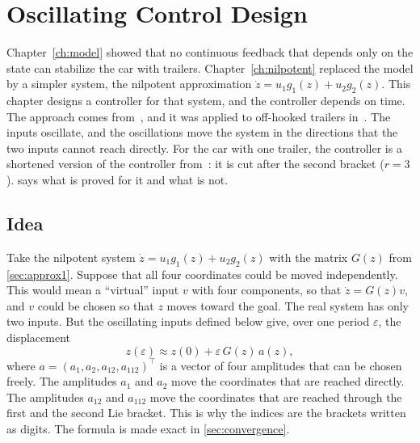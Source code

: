 
\chapter{Oscillating Control Design}
\label{ch:control}

Chapter~\ref{ch:model} showed that no continuous feedback that depends only on
the state can stabilize the car with trailers. Chapter~\ref{ch:nilpotent}
replaced the model by a simpler system, the nilpotent approximation
$\dot z=u_1g_1(z)+u_2g_2(z)$. This chapter designs a controller for that system,
and the controller depends on time. The approach comes
from~\cite{zuyev2016,grushkovskaya2023}, and it was applied to off-hooked
trailers in~\cite{zuyev2024}. The inputs oscillate, and the oscillations move
the system in the directions that the two inputs cannot reach directly. For the
car with one trailer, the controller is a shortened version of the controller
from~\cite{zuyev2024}: it is cut after the second bracket ($r=3$).
 says what is proved for it and what is not.

\section{Idea}
\label{sec:idea}

Take the nilpotent system $\dot z=u_1g_1(z)+u_2g_2(z)$ with the matrix $G(z)$
from \cref{sec:approx1}. Suppose that all four coordinates could be moved
independently. This would mean a ``virtual'' input $v$ with four components, so
that $\dot z=G(z)v$, and $v$ could be chosen so that $z$ moves toward the goal.
The real system has only two inputs. But the oscillating inputs defined below
give, over one period $\varepsilon$, the displacement
\begin{equation}
  z(\varepsilon)\approx z(0)+\varepsilon\,G(z)\,a(z),
  \label{eq:step}
\end{equation}
where $a=(a_1,a_2,a_{12},a_{112})^\top$ is a vector of four amplitudes that can
be chosen freely. The amplitudes $a_1$ and $a_2$ move the coordinates that are
reached directly. The amplitudes $a_{12}$ and $a_{112}$ move the coordinates that
are reached through the first and the second Lie bracket. This is why the indices
are the brackets written as digits. The formula is made exact in
\cref{sec:convergence}.

